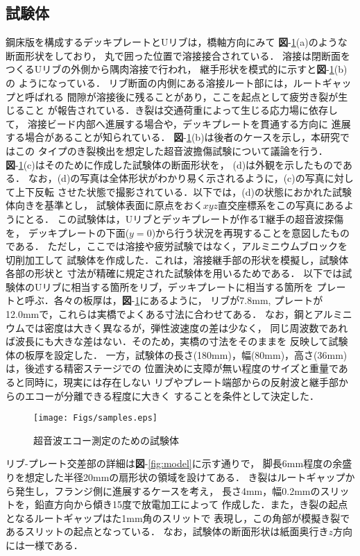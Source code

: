 \subsection{試験体}
鋼床版を構成するデッキプレートとUリブは，橋軸方向にみて
{\bf 図}-\ref{fig:spec}(a)のような断面形状をしており，
丸で囲った位置で溶接接合されている．
溶接は閉断面をつくるUリブの外側から隅肉溶接で行われ，
継手形状を模式的に示すと{\bf 図}-\ref{fig:spec}(b)の
ようになっている．
リブ断面の内側にある溶接ルート部には，ルートギャップと呼ばれる
間隙が溶接後に残ることがあり，ここを起点として疲労き裂が生じること
が報告されている．き裂は交通荷重によって生じる応力場に依存して，
溶接ビード内部へ進展する場合や，デッキプレートを貫通する方向に
進展する場合があることが知られている．
{\bf 図}-\ref{fig:spec}(b)は後者のケースを示し，本研究ではこの
タイプのき裂検出を想定した超音波擔傷試験について議論を行う．
{\bf 図}-\ref{fig:spec}(c)はそのために作成した試験体の断面形状を，
(d)は外観を示したものである．
なお，(d)の写真は全体形状がわかり易く示されるように，(c)の写真に対して上下反転
させた状態で撮影されている．以下では，(d)の状態におかれた試験体向きを基準とし，
試験体表面に原点をおく$xyz$直交座標系をこの写真にあるようにとる． 
この試験体は，Uリブとデッキプレートが作るT継手の超音波探傷を，
デッキプレートの下面($y=0$)から行う状況を再現することを意図したものである．
ただし，ここでは溶接や疲労試験ではなく，アルミニウムブロックを切削加工して
試験体を作成した．これは，溶接継手部の形状を模擬し，試験体各部の形状と
寸法が精確に規定された試験体を用いるためである．
以下では試験体のUリブに相当する箇所をリブ，デッキプレートに相当する箇所を
プレートと呼ぶ．各々の板厚は，{\bf 図}-\ref{fig:spec}にあるように，
リブが7.8mm, プレートが12.0mmで，これらは実橋でよくある寸法に合わせてある．
なお，鋼とアルミニウムでは密度は大きく異なるが，弾性波速度の差は少なく，
同じ周波数であれば波長にも大きな差はない．そのため，実橋の寸法をそのままを
反映して試験体の板厚を設定した．
一方，試験体の長さ(180mm)，幅(80mm)，高さ(36mm)は，後述する精密ステージでの
位置決めに支障が無い程度のサイズと重量であると同時に，現実には存在しない
リブやプレート端部からの反射波と継手部からのエコーが分離できる程度に大きく
することを条件として決定した．
\begin{figure}[b]
\centering
	\texttt{[image: Figs/samples.eps]}
\caption{超音波エコー測定のための試験体}
\label{fig:spec}
\end{figure}
リブ-プレート交差部の詳細は{\bf 図}-\ref{fig:model}に示す通りで，
脚長6mm程度の余盛りを想定した半径20mmの扇形状の領域を設けてある．
き裂はルートギャップから発生し，フランジ側に進展するケースを考え，
長さ4mm，幅0.2mmのスリットを，鉛直方向から傾き15度で放電加工によって
作成した．また，き裂の起点となるルートギャップはた1mm角のスリットで
表現し，この角部が模擬き裂であるスリットの起点となっている．
なお，試験体の断面形状は紙面奥行き$z$方向には一様である．
